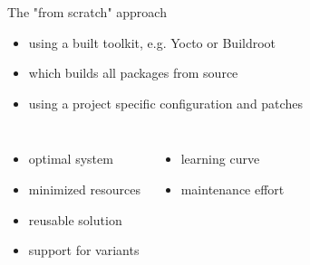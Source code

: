 \documentclass{beamer}
\newcommand\pro{\item[$+$]}
\newcommand\con{\item[$-$]}
\begin{document}
\begin{frame}{The "from scratch" approach}
	\begin{itemize}
		\item using a built toolkit, e.g. Yocto or Buildroot
		\item which builds all packages from source
		\item using a project specific configuration and patches
	\end{itemize}

	\begin{columns}[t]
        \centering
        \begin{itemize}
        	\pro optimal system
        	\pro minimized resources
        	\pro reusable solution
        	\pro support for variants
        \end{itemize}
        \centering
        \begin{itemize}
        		\con learning curve
        		\con maintenance effort
        \end{itemize}
    \end{columns}
\end{frame}
\end{document}
